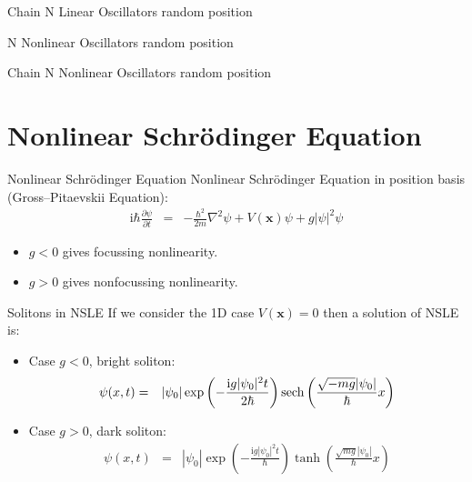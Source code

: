 \documentclass[aspectratio=169]{beamer}
\newcommand{\im}{\mathrm{i}} %
\begin{document}
\begin{frame}{Chain N Linear Oscillators random position}
    \centering
\end{frame}

\begin{frame}{N Nonlinear Oscillators random position}
    \centering
\end{frame}

\begin{frame}{Chain N Nonlinear Oscillators random position}
    \centering
\end{frame}

\section{Nonlinear Schr\"odinger Equation}

\begin{frame}{Nonlinear Schr\"odinger Equation}
    Nonlinear Schr\"odinger Equation in position basis (Gross–Pitaevskii Equation):
    \begin{eqnarray}
        \im \hbar \frac{\partial \psi}{\partial t} & = & 
            -\frac{\hbar^2}{2m}\nabla^2 \psi + V(\bm{x}) \psi + g |\psi|^2 \psi
    \end{eqnarray}
    \pause
    \begin{itemize}
        \item $g<0$  gives focussing nonlinearity. 
        \item $g>0$  gives nonfocussing nonlinearity. 
    \end{itemize}
\end{frame}

\begin{frame}{Solitons in NSLE}
    If we consider the 1D case $V(\bm{x})=0$ then a solution of NSLE is:
    \begin{itemize}
        \item Case $g<0$, bright soliton:
        \begin{eqnarray}
            \psi(x,t) & = &
                |\psi_0| \exp\left( - \frac{\im g |\psi_0|^2 t}{2\hbar} \right)\sech\left(\frac{\sqrt{-m g} |\psi_0|}{\hbar} x\right) \nonumber
        \end{eqnarray}
        \item Case $g>0$, dark soliton:
        \begin{eqnarray}
            \psi(x,t) & = &
                |\psi_0| \exp\left( - \frac{\im g |\psi_0|^2 t}{\hbar} \right) \tanh\left( \frac{\sqrt{mg}|\psi_0|}{\hbar}  x\right) \nonumber  
        \end{eqnarray}
    \end{itemize}
\end{frame}
\end{document}
